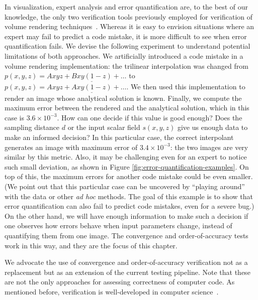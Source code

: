 In visualization, expert analysis and error quantification are, to the
best of our knowledge, the only two verification tools previously employed for
verification of volume rendering
techniques~\cite{Meissner:2000:PEP:353888.353903,
  Moller:1996:CLE:236226.236235,
  Smelyanskiy:2009:MHV:1638611.1639155}. Whereas it is easy to envision
situations where an expert may fail to predict a code mistake, it is
more difficult to see when error quantification fails.  We devise the
following experiment to understand potential limitations of both
approaches. We artificially introduced a code mistake in a volume
rendering implementation: the trilinear interpolation was changed from
$p(x,y,z) = Axyz + \underline{Bxy(1-z)} + \ldots$ to $p(x,y,z) = Axyz
+ \underline{Axy(1-z)} + \ldots$. We then used this implementation to
render an image whose analytical solution is known. Finally, we
compute the maximum error between the rendered and the analytical
solution, which in this case is $3.6 \times 10^{-3}$. How can one
decide if this value is good enough?  Does the sampling distance $d$
or the input scalar field $s(x,y,z)$ give us enough data to make an
informed decision? In this particular case, the correct interpolant
generates an image with maximum error of $3.4 \times 10^{-3}$: the two
images are very similar by this metric. Also, it may be challenging
even for an expert to notice such small deviation, as shown in Figure
\ref{fig:error-quantification-examples}. On top of this, the maximum
errors for another code mistake could be even smaller.
%
(We point out that this particular case can be
uncovered by ``playing around'' with the data or other \emph{ad hoc}
methods. The goal of this example is to show that error quantification
can also fail to predict code mistakes, even for a severe bug.)
%
On the other hand, we will have enough information to make such a
decision if one observes how errors behave when input parameters
change, instead of quantifying them from one image. The convergence
and order-of-accuracy tests work in this way, and they are the focus
of this chapter.

We advocate the use of convergence and order-of-accuracy verification
not as a replacement but as an extension of the current testing
pipeline.  
Note that these are not the only approaches for assessing correctness
of computer code. As mentioned before, verification is well-developed
in computer science~\cite{Clarke08,FLO67,godefroid08,
  Yang:2006:UMC:1189256.1189259}. 

